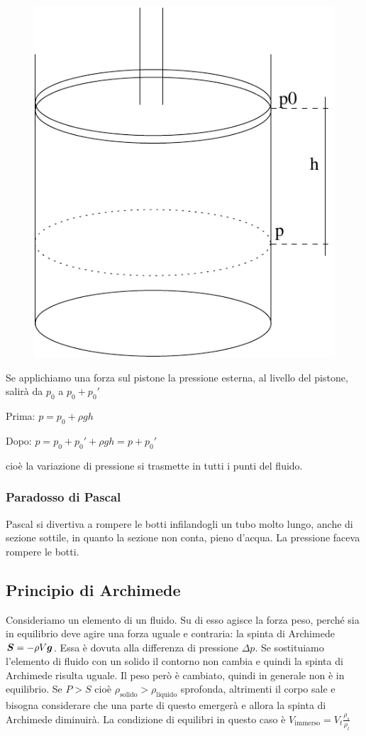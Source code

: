 \begin{figure}[htbp]
\centering
\includegraphics[scale=0.5]{immagini/fisica1/Pascal1}
\end{figure}

Se applichiamo una forza sul pistone la pressione esterna, al livello del pistone, salirà da $p_0$ a $p_0+p_0'$

Prima: $p=p_0+\rho gh$

Dopo: $p=p_0+p_0'+\rho gh=p+p_0'$

cioè la variazione di pressione si trasmette in tutti i punti del fluido.
\subsubsection{Paradosso di Pascal}
Pascal si divertiva a rompere le botti infilandogli un tubo molto lungo, anche di sezione sottile, in quanto la sezione non conta, pieno d'acqua. La pressione faceva rompere le botti.

\subsection{Principio di Archimede}
Consideriamo un elemento di un fluido. Su di esso agisce la forza peso, perché sia in equilibrio deve agire una forza uguale e contraria: la spinta di Archimede $\boldsymbol{S}=-\rho V\boldsymbol{g}$. Essa è dovuta alla differenza di pressione $\Delta p$. Se sostituiamo l'elemento di fluido con un solido il contorno non cambia e quindi la spinta di Archimede risulta uguale. Il peso però è cambiato, quindi in generale non è in equilibrio. Se $P>S$ cioè $\rho_\text{solido}>\rho_\text{liquido}$ sprofonda, altrimenti il corpo sale e bisogna considerare che una parte di questo emergerà e allora la spinta di Archimede diminuirà. La condizione di equilibri in questo caso è $V_\text{immerso}=V_t\frac{\rho_s}{\rho_l}$




